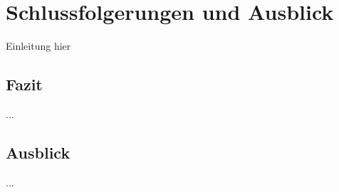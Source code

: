 
\section{Schlussfolgerungen und Ausblick} \label{sec:06-prospect}

Einleitung hier

\subsection{Fazit} \label{subsec:06-prospect-1}

...

\subsection{Ausblick} \label{subsec:06-prospect-2}

...

\clearpage
